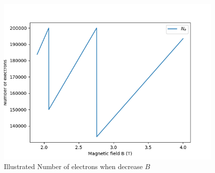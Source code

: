 \documentclass{beamer}
\begin{document}
\begin{frame}
\begin{columns}
\begin{column}{0.5\linewidth}
{\begin{figure}
\includegraphics[width = \linewidth]{images/Ne.png}
\caption{Illustrated Number of electrons when decrease \(B\)}
\end{figure}}
\end{column}
\end{columns}
\end{frame}
\end{document}
